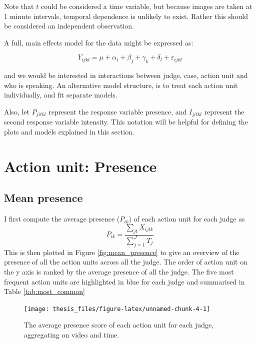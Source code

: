 \documentclass{monashthesis}
\begin{document}
Note that \(t\) could be considered a time variable, but because images are taken at 1 minute intervals, temporal dependence is unlikely to exist. Rather this should be considered an independent observation.

A full, main effects model for the data might be expressed as:

\[Y_{ijkl} = \mu + \alpha_i + \beta_j + \gamma_k + \delta_l + \varepsilon_{ijkl}\]

\noindent and we would be interested in interactions between judge, case, action unit and who is speaking. An alternative model structure, is to treat each action unit individually, and fit separate models.

Also, let \(P_{jitkl}\) represent the response variable presence, and \(I_{jitkl}\) represent the second response variable intensity. This notation will be helpful for defining the plots and models explained in this section.

\hypertarget{action-unit-presence}{%
\section{Action unit: Presence}\label{action-unit-presence}}

\hypertarget{mean-presence}{%
\subsection{Mean presence}\label{mean-presence}}

I first compute the average presence (\(P_{ik}\)) of each action unit for each judge as \[P_{ik} = \frac{\sum_{jt}X_{ijtk}}{\sum_{j = 1}^JT_j}\] This is then plotted in Figure \ref{fig:mean_presence} to give an overview of the presence of all the action units across all the judge. The order of action unit on the y axis is ranked by the average presence of all the judge. The five most frequent action units are highlighted in blue for each judge and summarised in Table \ref{tab:most_common}

\begin{figure}
\texttt{[image: thesis\_files/figure-latex/unnamed-chunk-4-1]} \caption{The average presence score of each action unit for each judge, aggregating on video and time. \label{fig:mean_presence}}\label{fig:unnamed-chunk-4}
\end{figure}
\end{document}
